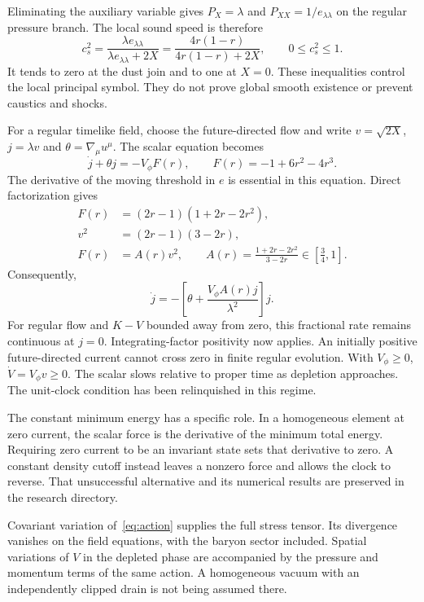 \documentclass[11pt]{article}
\begin{document}
Eliminating the auxiliary variable gives $P_X=\lambda$ and
$P_{XX}=1/e_{\lambda\lambda}$ on the regular pressure branch.
The local sound speed is therefore\cite{Garriga}
\begin{equation}\label{eq:sound}
 c_s^2=\frac{\lambda e_{\lambda\lambda}}
 {\lambda e_{\lambda\lambda}+2X}
 =\frac{4r(1-r)}{4r(1-r)+2X},\qquad 0\le c_s^2\le1.
\end{equation}
It tends to zero at the dust join and to one at $X=0$. These inequalities
control the local principal symbol. They do not prove global smooth
existence or prevent caustics and shocks.

For a regular timelike field, choose the future-directed flow and write
$v=\sqrt{2X}$, $j=\lambda v$ and $\theta=\nabla_\mu u^\mu$.
The scalar equation becomes
\begin{equation}\label{eq:current}
 \dot j+\theta j=-V_\phi F(r),\qquad
 F(r)=-1+6r^2-4r^3.
\end{equation}
The derivative of the moving threshold in $e$ is essential in this equation.
Direct factorization gives
\begin{align}
 F(r)&=(2r-1)(1+2r-2r^2),\\
 v^2&=(2r-1)(3-2r),\\
 F(r)&=A(r)v^2,\qquad
 A(r)=\frac{1+2r-2r^2}{3-2r}\in[\tfrac34,1].
\end{align}
Consequently,
\begin{equation}\label{eq:regular}
 \dot j=-\left[\theta+\frac{V_\phi A(r)j}{\lambda^2}\right]j.
\end{equation}
For regular flow and $K-V$ bounded away from zero, this fractional rate
remains continuous at $j=0$. Integrating-factor positivity now applies.
An initially positive future-directed current cannot cross zero in finite
regular evolution. With $V_\phi\ge0$, $\dot V=V_\phi v\ge0$.
The scalar slows relative to proper time as depletion approaches. The
unit-clock condition has been relinquished in this regime.

The constant minimum energy has a specific role. In a homogeneous element
at zero current, the scalar force is the derivative of the minimum total
energy. Requiring zero current to be an invariant state sets that derivative
to zero. A constant density cutoff instead leaves a nonzero force and allows
the clock to reverse. That unsuccessful alternative and its numerical
results are preserved in the research directory.

Covariant variation of~\eqref{eq:action} supplies the full stress tensor.
Its divergence vanishes on the field equations, with the baryon sector
included. Spatial variations of $V$ in the depleted phase are accompanied
by the pressure and momentum terms of the same action. A homogeneous vacuum
with an independently clipped drain is not being assumed there.
\end{document}
